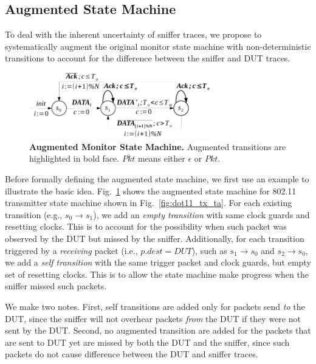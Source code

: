 \subsection{Augmented State Machine}
\label{subsec:augment}

To deal with the inherent uncertainty of sniffer traces, we propose to
systematically augment the original monitor state machine with non-deterministic
transitions to account for the difference between the sniffer and DUT traces.

\begin{figure}[h!]
  \vspace*{-5mm}
  \centering
  \includegraphics[width=0.7\textwidth]{./figures/dot11_tx_checker.pdf}
  \caption{\textbf{Augmented Monitor State Machine.} Augmented transitions are
  highlighted in bold face. $\overline{Pkt}$ means either $\epsilon$ or $Pkt$.}
  \label{fig:augment}
  \vspace*{-1mm}
\end{figure}


Before formally defining the augmented state machine, we first use an example to
illustrate the basic idea. Fig.~\ref{fig:augment} shows the augmented state
machine for 802.11 transmitter state machine shown in
Fig.~\ref{fig:dot11_tx_ta}.  For each existing transition (e.g., $s_0\rightarrow
s_1$), we add an \textit{empty transition} with same clock guards and resetting
clocks.  This is to account for the possibility when such packet was observed by
the DUT but missed by the sniffer.  Additionally, for each transition triggered
by a \textit{receiving} packet (i.e., $p.dest = DUT$), such as $s_1\rightarrow
s_0$ and $s_2\rightarrow s_0$, we add a \textit{self transition} with the same
trigger packet and clock guards, but empty set of resetting clocks. This is to
allow the state machine make progress when the sniffer missed such packets.

We make two notes. First, self transitions are added only for
packets send \textit{to} the DUT, since the sniffer will not overhear packets
\textit{from} the DUT if they were not sent by the DUT. Second, no augmented
transition are added for the packets that are sent to DUT yet are missed by both
the DUT and the sniffer, since such packets do not cause difference between the
DUT and sniffer traces.

